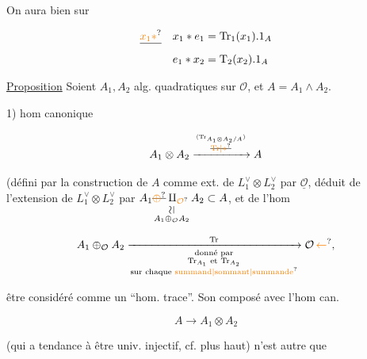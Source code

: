On aura bien sur

\[
\begin{aligned}
\deleted{\unsure{x_1*}}\quad x_1*e_1&=\mathrm{Tr}_1(x_1).1_A\\
e_1*x_2&=\mathrm T_2(x_2).1_A
\end{aligned}
\]




\uline{Proposition} Soient $A_1,A_2$  alg. quadratiques sur $\mathcal O$, et $A=A_1\wedge A_2$. 

1)  hom canonique

\[
A_1\otimes A_2\xrightarrow{\overset{\inserted{\mathrm{Tr}_{A_1\otimes A_2/A}}}{\deleted{\unsure{\mathrm{Tr}|*}}}}A
\]

(défini par la construction de $A$ comme ext. de $L_1^\vee\otimes L_2^\vee$ par $\underline{\mathcal O}$, déduit de l'extension  de $L_1^\vee\otimes L_2^\vee$ par
$\underset{\substack{\rotatebox{90}{$\simeq$}\\ A_1\oplus_{\mathcal O}A_2}}{A_1\deleted{\unsure{\oplus}}\amalg_{\unsure{\mathcal O}}A_2}\subset A$, et de l'hom

\[
A_1\oplus_{\mathcal O}A_2
\xrightarrow[\substack{\text{donné par}\\\mathrm{Tr}_{A_1}\text{ et }\mathrm{Tr}_{A_2}\\\text{sur chaque \unsure{summand|sommant|summande}}}]{\mathrm{Tr}}\mathcal O\,\unsure{\leftarrow},
\]


être considéré comme un ``hom. trace''. Son composé avec l'hom can.

\[
A\longrightarrow A_1\otimes A_2
\]

(qui a tendance à être univ. injectif, cf. plus haut)  n'est autre que


